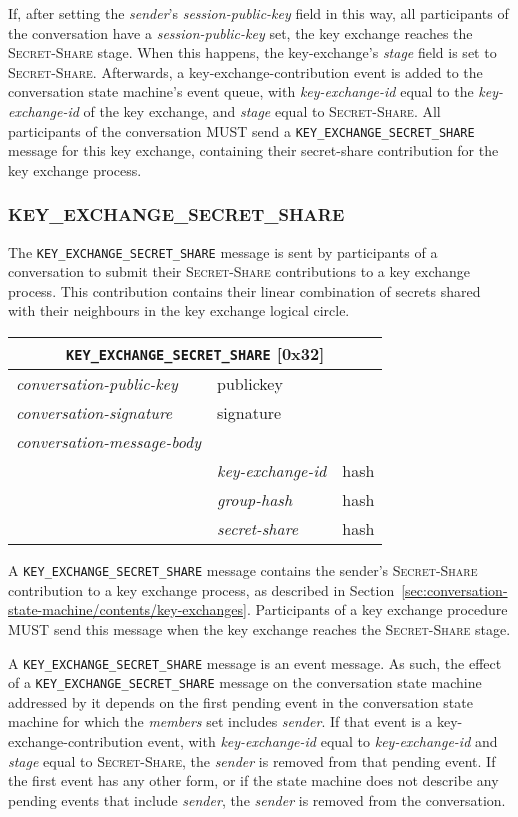 \documentclass{article}
\def\message#1{\texttt{#1}}
\def\field#1{\textit{#1}}
\def\smfield#1{\textsl{#1}}
\def\type#1{\textsf{#1}}
\newenvironment{conversationmessage}[2]{
\newcommand{\messagefield}[2]{
& \field{##1} & \type{##2} \\
\hline
}
\hspace{2em minus 2em}\begin{tabular}{|l|l|l|}
\hline
\multicolumn{3}{|c|}{\message{#1} [#2]} \\
\hline
\hline
\field{conversation-public-key} & \multicolumn{2}{l|}{\type{publickey}} \\
\hline
\field{conversation-signature} & \multicolumn{2}{l|}{\type{signature}} \\
\hline
\field{conversation-message-body} & \multicolumn{2}{l|}{} \\
\hline
}{
\end{tabular}
}
\begin{document}
If, after setting the \field{sender}'s \smfield{session-public-key} field in this way, all participants of the conversation have a \smfield{session-public-key} set, the key exchange reaches the \textsc{Secret-Share} stage.
When this happens, the \type{key-exchange}'s \smfield{stage} field is set to \textsc{Secret-Share}.
Afterwards, a \type{key-exchange-contribution} event is added to the conversation state machine's event queue, with \smfield{key-exchange-id} equal to the \smfield{key-exchange-id} of the key exchange, and \smfield{stage} equal to \textsc{Secret-Share}.
All participants of the conversation MUST send a \message{KEY\_EXCHANGE\_SECRET\_SHARE} message for this key exchange, containing their secret-share contribution for the key exchange process.


\subsubsection{KEY\_EXCHANGE\_SECRET\_SHARE}
\label{sec:messages/key-exchange-secret-share}

The \message{KEY\_EXCHANGE\_SECRET\_SHARE} message is sent by participants of a conversation to submit their \textsc{Secret-Share} contributions to a key exchange process.
This contribution contains their linear combination of secrets shared with their neighbours in the key exchange logical circle.

\begin{conversationmessage}{KEY\_EXCHANGE\_SECRET\_SHARE}{0x32}
\messagefield{key-exchange-id}{hash}
\messagefield{group-hash}{hash}
\messagefield{secret-share}{hash}
\end{conversationmessage}

A \message{KEY\_EXCHANGE\_SECRET\_SHARE} message contains the sender's \textsc{Secret-Share} contribution to a key exchange process, as described in Section~\ref{sec:conversation-state-machine/contents/key-exchanges}.
Participants of a key exchange procedure MUST send this message when the key exchange reaches the \textsc{Secret-Share} stage.

A \message{KEY\_EXCHANGE\_SECRET\_SHARE} message is an event message.
As such, the effect of a \message{KEY\_EXCHANGE\_SECRET\_SHARE} message on the conversation state machine addressed by it depends on the first pending event in the conversation state machine for which the \smfield{members} set includes \field{sender}.
If that event is a \type{key-exchange-contribution} event, with \smfield{key-exchange-id} equal to \field{key-exchange-id} and \smfield{stage} equal to \textsc{Secret-Share}, the \field{sender} is removed from that pending event.
If the first event has any other form, or if the state machine does not describe any pending events that include \field{sender}, the \field{sender} is removed from the conversation.
\end{document}
